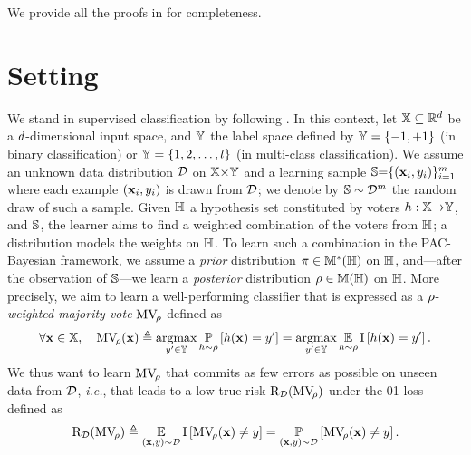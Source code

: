 We provide all the proofs in  for completeness.

\section{Setting}

We stand in supervised classification by following .
In this context, let $\X \subseteq \Rbb^{\d}$ be a $\d$-dimensional input space, and $\Y$ the label space defined by $\Y=\{-1, +1\}$ (in binary classification) or $\Y=\{1, 2, \dots, \L\}$ (in multi-class classification).
We assume an unknown data distribution $\D$ on $\X{\times}\Y$ and a learning sample  $\S{=}\{(\x_i, \y_i)\}_{i=1}^{\m}$  where each example $(\x_i,\y_i)$ is drawn \iid from $\D$; we denote by $\S\sim\D^\m$ the random draw of such a sample.
Given $\H$ a hypothesis set constituted by voters $\h:\X{\rightarrow}\Y$, and  $\S$, the learner aims to find a weighted combination of the voters from $\H$; a distribution models the weights on $\H$.
To learn such a combination in the PAC-Bayesian framework, we assume a {\it prior} distribution $\P\in\M^{*}(\H)$ on $\H$, and---after the observation of $\S$---we learn a {\it posterior} distribution $\Q\in\M(\H)$ on $\H$.
More precisely, we aim to learn a well-performing classifier that is expressed as a $\Q$-\textit{weighted majority vote} $\MVQ$ defined as 
\begin{align*}
\forall \x\in\X,\quad  \MVQ(\x) \defeq \argmax_{\y'\in\Y} \PP_{\h\sim\Q}\LB \h(\x) = \y'\RB = \argmax_{\y'\in\Y}\EE_{\h\sim\Q}\indic\LB \h(\x) = \y'\RB.
\end{align*}
We thus want to learn $\MVQ$ that  commits as few errors as possible on unseen data from $\D$,
{\it i.e.}, that leads to a low true risk $\Risk_{\D}(\MVQ)$ under the 01-loss defined as
\begin{align*}
\Risk_{\D}(\MVQ) \triangleq \EE_{(\x, \y)\sim\D} \indic\LB \MVQ(\x) \ne \y\RB = \PP_{(\x, \y)\sim\D}\LB \MVQ(\x) \ne \y\RB.
\end{align*}

